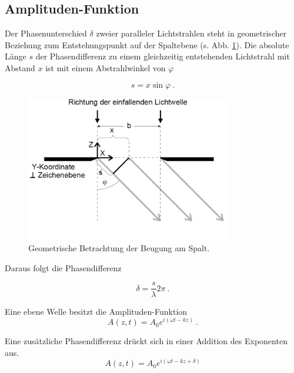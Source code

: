 \subsection{Amplituden-Funktion}
Der Phasenunterschied $\delta$ zweier paralleler Lichtstrahlen steht in geometrischer Beziehung zum Entstehungspunkt auf der Spaltebene (s. Abb. \ref{fig:BeugSpalt}).
Die absolute Länge $s$ der Phasendifferenz zu einem gleichzeitig entstehenden Lichtstrahl mit Abstand $x$ ist mit einem Abstrahlwinkel von $\varphi$

\begin{equation}
  s = x\sin{\varphi} \:.
  \label{eqn:s}
\end{equation}

\begin{figure}
  \centering
  \includegraphics[width=0.8\textwidth]{plots/Beugung Einzelspalt.png}
  \caption{Geometrische Betrachtung der Beugung am Spalt.\cite{Versuchsanleitung}}
  \label{fig:BeugSpalt}
\end{figure}

Daraus folgt die Phasendifferenz

\begin{equation}
  \delta = \frac{s}{\lambda}2\pi \:.
  \label{eqn:delta}
\end{equation}



Eine ebene Welle besitzt die Amplituden-Funktion 
\begin{equation}
  A(z, t) = A_0e^{i(\omega t - kz)} \:.
\end{equation}

Eine zusätzliche Phasendifferenz drückt sich in einer Addition des Exponenten aus.
\begin{equation*}
  A(z, t) = A_0e^{i(\omega t - kz + \delta)}
\end{equation*}

